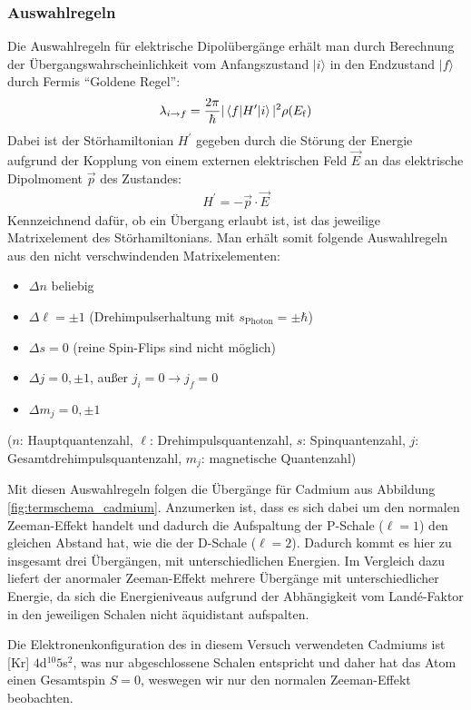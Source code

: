 \documentclass[11pt, a4paper]{article}
\begin{document}
\subsubsection{Auswahlregeln}
\label{sec:auswahlregeln}
Die Auswahlregeln für elektrische Dipolübergänge erhält man durch Berechnung der Übergangswahrscheinlichkeit vom Anfangszustand $|i\rangle$ in den Endzustand $|f\rangle$ durch Fermis "`Goldene Regel"':
\begin{align*}
	\lambda_{i\rightarrow f} = \frac{2 \pi}{\hbar} | \braket{f|H^\prime|i} |^2 \rho(E_\mathrm{f})
\end{align*}
Dabei ist der Störhamiltonian $H^\prime$ gegeben durch die Störung der Energie aufgrund der Kopplung von einem externen elektrischen Feld $\vec{E}$ an das elektrische Dipolmoment $\vec{p}$ des Zustandes:
\begin{align*}
	H^\prime = - \vec{p} \cdot \vec{E}
\end{align*}
Kennzeichnend dafür, ob ein Übergang erlaubt ist, ist das jeweilige Matrixelement des Störhamiltonians.
Man erhält somit folgende Auswahlregeln aus den nicht verschwindenden Matrixelementen:
\begin{itemize}
	\item $\Delta n$ beliebig
	\item $\Delta \ell = \pm 1$ \quad (Drehimpulserhaltung mit $s_\mathrm{Photon} = \pm \hbar$)
	\item $\Delta s = 0$ \quad (reine Spin-Flips sind nicht möglich)
	\item $\Delta j = 0, \pm 1$, außer $j_i=0 \rightarrow j_f=0$
	\item $\Delta m_j = 0, \pm 1$
\end{itemize}
($n$: Hauptquantenzahl, $\ell$: Drehimpulsquantenzahl, $s$: Spinquantenzahl, $j$: Gesamtdrehimpulsquantenzahl, $m_j$: magnetische Quantenzahl)

Mit diesen Auswahlregeln folgen die Übergänge für Cadmium aus Abbildung \ref{fig:termschema_cadmium}.
Anzumerken ist, dass es sich dabei um den normalen Zeeman-Effekt handelt und dadurch die Aufspaltung der P-Schale ($\ell = 1$) den gleichen Abstand hat, wie die der D-Schale ($\ell = 2$).
Dadurch kommt es hier zu insgesamt drei Übergängen, mit unterschiedlichen Energien.
Im Vergleich dazu liefert der anormaler Zeeman-Effekt mehrere Übergänge mit unterschiedlicher Energie, da sich die Energieniveaus aufgrund der Abhängigkeit vom Landé-Faktor in den jeweiligen Schalen nicht äquidistant aufspalten.

Die Elektronenkonfiguration des in diesem Versuch verwendeten Cadmiums ist [Kr] $4$d$^{10} 5$s$^2$, was nur abgeschlossene Schalen entspricht und daher hat das Atom einen Gesamtspin $S=0$, weswegen wir nur den normalen Zeeman-Effekt beobachten.
\end{document}
